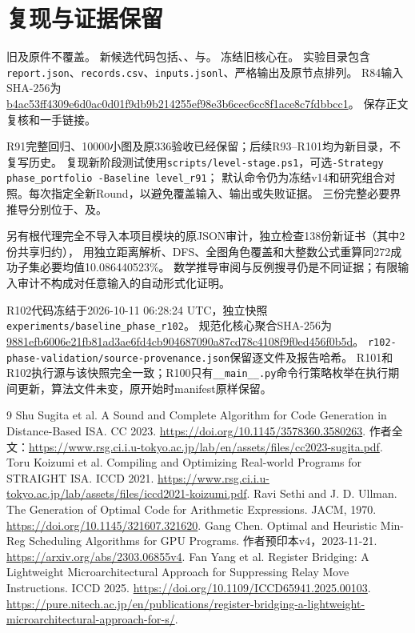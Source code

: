 \documentclass[UTF8,11pt,a4paper]{ctexart}
\begin{document}
\section{复现与证据保留}
旧及原件不覆盖。
新候选代码包括、、与。
冻结旧核心在。
实验目录包含\texttt{report.json}、\texttt{records.csv}、\texttt{inputs.jsonl}、严格输出及原节点排列。
R84输入SHA-256为
\url{b4ac53ff4309e6d0ac0d01f9db9b214255ef98e3b6cec6cc8f1ace8c7fdbbcc1}。
保存正文复核和一手链接。

R91完整回归、10000小图及原336验收已经保留；后续R93--R101均为新目录，不复写历史。
复现新阶段测试使用\texttt{scripts/level-stage.ps1}，可选\texttt{-Strategy phase\_portfolio -Baseline level\_r91}；
默认命令仍为冻结v14和研究组合对照。每次指定全新Round，以避免覆盖输入、输出或失败证据。
三份完整必要界推导分别位于、及。

另有根代理完全不导入本项目模块的原JSON审计，独立检查138份新证书（其中2份共享归约），
用独立距离解析、DFS、全图角色覆盖和大整数公式重算同272成功子集必要均值10.086440523\%。
数学推导审阅与反例搜寻仍是不同证据；有限输入审计不构成对任意输入的自动形式化证明。

R102代码冻结于2026-10-11 06:28:24 UTC，独立快照\texttt{experiments/baseline\_phase\_r102}。
规范化核心聚合SHA-256为
\url{9881efb6006e21fb81ad3ae6fd4cb904687090a87cd78c4108f9f0ed456f0b5d}。
\texttt{r102-phase-validation/source-provenance.json}保留逐文件及报告哈希。
R101和R102执行源与该快照完全一致；R100只有\texttt{\_\_main\_\_.py}命令行策略枚举在执行期间更新，算法文件未变，原开始时manifest原样保留。

\begin{thebibliography}{9}
 Shu Sugita et al. A Sound and Complete Algorithm for Code Generation in Distance-Based ISA. CC 2023.
\url{https://doi.org/10.1145/3578360.3580263}.
作者全文：\url{https://www.rsg.ci.i.u-tokyo.ac.jp/lab/en/assets/files/cc2023-sugita.pdf}.
 Toru Koizumi et al. Compiling and Optimizing Real-world Programs for STRAIGHT ISA. ICCD 2021.
\url{https://www.rsg.ci.i.u-tokyo.ac.jp/lab/assets/files/iccd2021-koizumi.pdf}.
 Ravi Sethi and J. D. Ullman. The Generation of Optimal Code for Arithmetic Expressions. JACM, 1970.
\url{https://doi.org/10.1145/321607.321620}.
 Gang Chen. Optimal and Heuristic Min-Reg Scheduling Algorithms for GPU Programs. 作者预印本v4，2023-11-21.
\url{https://arxiv.org/abs/2303.06855v4}.
 Fan Yang et al. Register Bridging: A Lightweight Microarchitectural Approach for Suppressing Relay Move Instructions. ICCD 2025.
\url{https://doi.org/10.1109/ICCD65941.2025.00103}.
\url{https://pure.nitech.ac.jp/en/publications/register-bridging-a-lightweight-microarchitectural-approach-for-s/}.
\end{thebibliography}
\end{document}
